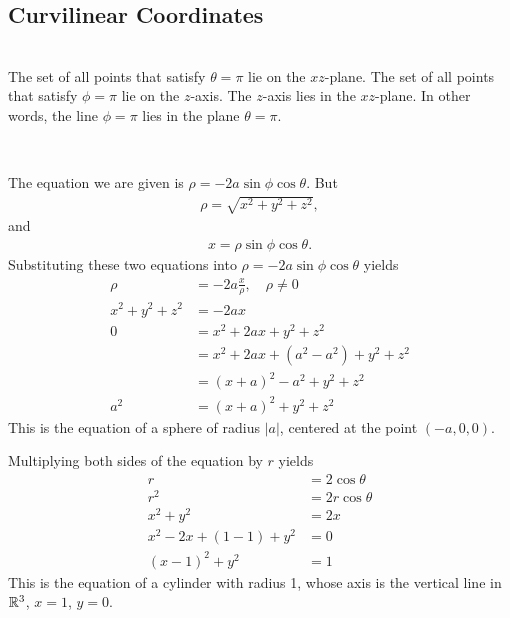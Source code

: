 \subsection{Curvilinear Coordinates}


\BEN
\item 
{}\\
The set of all points that satisfy $\theta = \pi$ lie on the $xz$-plane. The set of all points that satisfy $\phi=\pi$ lie on the $z$-axis. The $z$-axis lies in the $xz$-plane. In other words, the line $\phi = \pi$ lies in the plane $\theta=\pi$.
\item 
{}\\
\BEN
\item The equation we are given is $\rho = -2a \sin\phi \cos\theta.$ But 
\begin{align*}
  \rho = \sqrt{x^2+y^2+z^2},
\end{align*}
and
\begin{align*}
  x = \rho \sin\phi\cos\theta.
\end{align*}
Substituting these two equations into $ \rho = -2a \sin\phi \cos\theta$ yields
\begin{align*}
  \rho &= -2a \frac{x}{\rho} , \quad \rho \ne 0\\
  x^2+y^2+z^2 &= -2a x \\
   0 
   &= x^2+2ax +y^2+z^2 \\
   &= x^2+2ax +(a^2 - a^2) +y^2+z^2 \\
   &= (x+a)^2 - a^2 +y^2+z^2 \\
   a^2 &= (x+a)^2 +y^2+z^2 
\end{align*}
This is the equation of a sphere of radius $|a|$, centered at the point $(-a,0,0)$. 
\item Multiplying both sides of the equation by $r$ yields
\begin{align*}
  r &= 2\cos\theta \\
  r^2 &= 2r\cos\theta \\
  x^2+y^2 &= 2x \\
  x^2-2x+(1-1)+y^2 &= 0 \\
  (x-1)^2+y^2 &= 1
\end{align*}
This is the equation of a cylinder with radius 1, whose axis is the vertical line in $\mathbb{R}^3$, $x=1$, $y=0$. 
